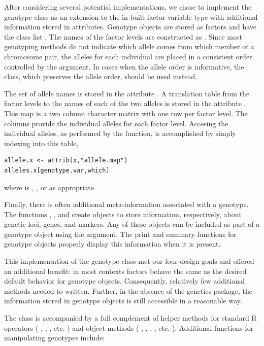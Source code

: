 \documentclass{report}
\begin{document}
After considering several potential implementations, we chose to
implement the genotype class as an extension to the in-built factor
variable type with additional information stored in attributes.
Genotype objects are stored as factors and have the class list
.  The names of the factor levels are
constructed as .  Since most
genotyping methods do not indicate which allele comes from which
member of a chromosome pair, the alleles for each individual are
placed in a consistent order controlled by the 
argument.  In cases when the allele order is informative, the
 class, which preserves the allele order, should be
used instead.

The set of allele names is stored in the attribute
.  A translation table from the factor levels to
the names of each of the two alleles is stored in the attribute
.  This map is a two column character matrix with one
row per factor level.  The columns provide the individual alleles for
each factor level.  Accesing the individual alleles, as performed by
the  function, is accomplished by simply indexing into
this table,
\begin{verbatim}
allele.x <- attrib(x,"allele.map") 
alleles.x[genotype.var,which]
\end{verbatim}
where  is , , or  as
appropriate.

Finally, there is often additional meta-information associated with a
genotype.  The functions , , and 
create objects to store information, respectively, about genetic loci,
genes, and markers.  Any of these objects can be included as part of a
genotype object using the  argument. The print and summary
functions for genotype objects properly display this information when
it is present.

This implementation of the genotype class met our four design goals
and offered an additional benefit: in most contexts factors behave the
same as the desired default behavior for genotype objects.
Consequently, relatively few additional methods needed to written.
Further, in the absence of the genetics package, the information
stored in genotype objects is still accessible in a reasonable way.

The  class is accompanied by a full complement of
helper methods for standard R operators ( \code{[]}, \code{[<-},
\code{==}, etc. ) and object methods ( , ,
, , etc. ).  Additional functions for manipulating genotypes include: 
\end{document}

